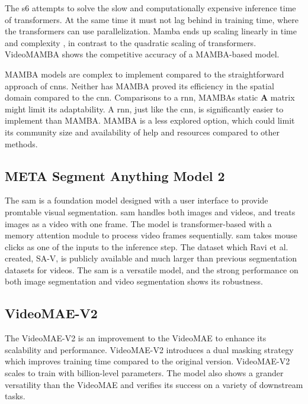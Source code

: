The \acrlong{s6} attempts to solve the slow and computationally expensive inference time of transformers. At the same time it must not lag behind in training time, where the transformers can use parallelization. Mamba ends up scaling linearly in time and complexity \cite{lee_enhancing_mamba_s6_2024}, in contrast to the quadratic scaling of transformers. VideoMAMBA \cite{li_videomamba_2024} shows the competitive accuracy of a MAMBA-based model.

MAMBA models are complex to implement compared to the straightforward approach of \acrshort{cnn}s. Neither has MAMBA proved its efficiency in the spatial domain compared to the \acrshort{cnn}. Comparisons to a \acrlong{rnn}, MAMBAs static \textbf{A} matrix might limit its adaptability. A \acrshort{rnn}, just like the \acrshort{cnn}, is significantly easier to implement than MAMBA. MAMBA is a less explored option, which could limit its community size and availability of help and resources compared to other methods. 

\subsection{META Segment Anything Model 2}

The \acrfull{sam} is a foundation model designed with a user interface to provide promtable visual segmentation. \acrshort{sam} handles both images and videos, and treats images as a video with one frame. The model is transformer-based  with a memory attention module to process video frames sequentially. \acrshort{sam} takes mouse clicks as one of the inputs to the inference step. The dataset which Ravi et al. created, SA-V, is publicly available and much larger than previous segmentation datasets for videos. The \acrfull{sam} is a versatile model, and the strong performance on both image segmentation and video segmentation shows its robustness. 

\subsection{VideoMAE-V2}

The VideoMAE-V2 \cite{wang_videomae_2023} is an improvement to the VideoMAE to enhance its scalability and performance. VideoMAE-V2 introduces a dual masking strategy which improves training time compared to the original version. VideoMAE-V2 scales to train with billion-level parameters. The model also shows a grander versatility than the VideoMAE and verifies its success on a variety of downstream tasks. 

